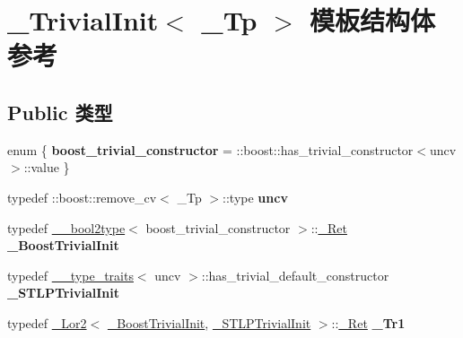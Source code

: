 \hypertarget{struct___trivial_init}{}\section{\+\_\+\+Trivial\+Init$<$ \+\_\+\+Tp $>$ 模板结构体 参考}
\label{struct___trivial_init}
\subsection*{Public 类型}
\begin{DoxyCompactItemize}
\item 
\mbox{\label{struct___trivial_init_af715c3c35a38c7db785025fae3b67d16}} 
enum \{ {\bfseries boost\+\_\+trivial\+\_\+constructor} = \+:\+:boost\+:\+:has\+\_\+trivial\+\_\+constructor$<$uncv$>$\+:\+:value
 \}
\item 
\mbox{\label{struct___trivial_init_ab8cc52da2973b7c5da24a8c481b6e41f}} 
typedef \+::boost\+::remove\+\_\+cv$<$ \+\_\+\+Tp $>$\+::type {\bfseries uncv}
\item 
\mbox{\label{struct___trivial_init_aa1c36a86e93b82e05007b4b623b88d69}} 
typedef \hyperlink{struct____bool2type}{\+\_\+\+\_\+bool2type}$<$ boost\+\_\+trivial\+\_\+constructor $>$\+::\hyperlink{struct____false__type}{\+\_\+\+Ret} {\bfseries \+\_\+\+Boost\+Trivial\+Init}
\item 
\mbox{\label{struct___trivial_init_a4d1e927586a5d7be536e2b997f4dc3da}} 
typedef \hyperlink{struct____type__traits}{\+\_\+\+\_\+type\+\_\+traits}$<$ uncv $>$\+::has\+\_\+trivial\+\_\+default\+\_\+constructor {\bfseries \+\_\+\+S\+T\+L\+P\+Trivial\+Init}
\item 
\mbox{\label{struct___trivial_init_a749792aab1cbdbd2008c8a53e64da07b}} 
typedef \hyperlink{struct___lor2}{\+\_\+\+Lor2}$<$ \hyperlink{struct____true__type}{\+\_\+\+Boost\+Trivial\+Init}, \hyperlink{struct____true__type}{\+\_\+\+S\+T\+L\+P\+Trivial\+Init} $>$\+::\hyperlink{struct____false__type}{\+\_\+\+Ret} {\bfseries \+\_\+\+Tr1}
\item 
\mbox{\label{struct___trivial_init_a2b870065bbb9c93f013c520ccdb99ecf}} 

\end{DoxyCompactItemize}

